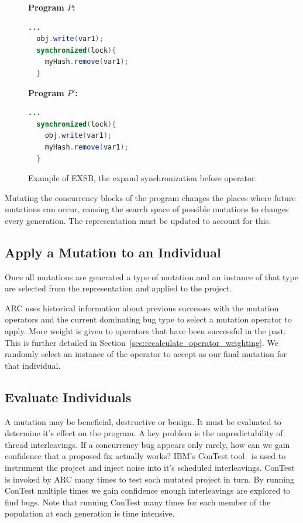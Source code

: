 \documentclass[10pt, conference, compsocconf]{IEEEtran}
\begin{document}
\begin{figure}[h!]
\vspace{2mm}
\begin{minipage}{3.70cm}

\footnotesize{\textbf{ Program $P$:}}
\begin{lstlisting}[language=Java]
  ...
  obj.write(var1);
  synchronized(lock){
    myHash.remove(var1);
  }
\end{lstlisting}
\end{minipage}\hfill
\begin{minipage}{3.70cm}
\footnotesize{\textbf{ Program $P'$:}}
\begin{lstlisting}[language=Java]
  ...
  synchronized(lock){
    obj.write(var1);
    myHash.remove(var1);
  }
\end{lstlisting}
\end{minipage}

\caption{Example of EXSB, the expand synchronization before operator.}
\label{fig:EXSB_example}
\end{figure}

Mutating the concurrency blocks of the program changes the places where future mutations can occur, causing the search space of possible mutations to changes every generation. The representation must be updated to account for this.

\subsection{Apply a Mutation to an Individual}
\label{sec:mutate_individuals}

Once all mutations are generated a type of mutation and an instance of that
type are selected from the representation and applied to the project.

ARC uses historical information about previous successes with the mutation operators and the current dominating bug type to select a mutation operator to apply. More weight is given to operators that have been successful in the past. This is further detailed in Section~\ref{sec:recalculate_operator_weighting}. We randomly select an
instance of the operator to accept as our final mutation for that individual.

\subsection{Evaluate Individuals}
\label{sec:evalute_individuals}

A mutation may be beneficial, destructive or benign. It must be evaluated to
determine it's effect on the program. A key problem is the unpredictability of  thread interleavings.  If a concurrency bug appears only rarely, how can we gain confidence that a proposed fix actually works?  IBM's ConTest tool~\cite{EFN+02} is used to instrument the project and inject noise into it's scheduled interleavings. ConTest is invoked by ARC many times to test each mutated project in turn. By running ConTest multiple times we gain confidence enough interleavings are explored to find bugs. Note that running ConTest many times for each member of
the population at each generation is time intensive.
\end{document}
